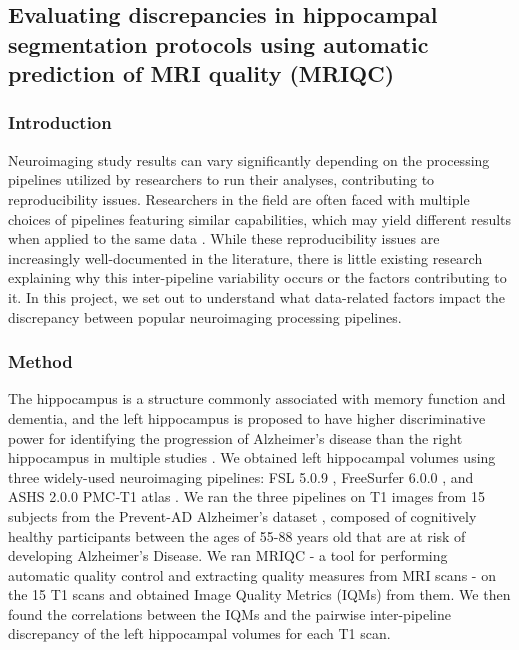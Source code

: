 \documentclass[../main.tex]{subfiles}
\begin{document}
\subsection{Evaluating discrepancies in hippocampal segmentation protocols using automatic prediction of MRI quality (MRIQC)}


\subsubsection{Introduction}

Neuroimaging study results can vary significantly depending on the processing pipelines utilized by researchers to run their analyses, contributing to reproducibility issues. Researchers in the field are often faced with multiple choices of pipelines featuring similar capabilities, which may yield different results when applied to the same data \citep{carp2012plurality, kennedy2019everything}. While these reproducibility issues are increasingly well-documented in the literature, there is little existing research explaining why this inter-pipeline variability occurs or the factors contributing to it. In this project, we set out to understand what data-related factors impact the discrepancy between popular neuroimaging processing pipelines.

\subsubsection{Method}

The hippocampus is a structure commonly associated with memory function and dementia, and the left hippocampus is proposed to have higher discriminative power for identifying the progression of Alzheimer’s disease than the right hippocampus in multiple studies \citep{schuff2009mri}. We obtained left hippocampal volumes using three widely-used neuroimaging pipelines: FSL 5.0.9 \citep{patenaude2011bayesian}, FreeSurfer 6.0.0 \citep{fischl2012freesurfer}, and ASHS 2.0.0 PMC‐T1 atlas \citep{xie2019automated}.
We ran the three pipelines on T1 images from 15 subjects from the Prevent-AD Alzheimer’s dataset \citep{tremblay2021open}, composed of cognitively healthy participants between the ages of 55-88 years old that are at risk of developing Alzheimer's Disease. 
We ran MRIQC \citep{esteban2017mriqc} - a tool for performing automatic quality control and extracting quality measures from MRI scans - on the 15 T1 scans and obtained Image Quality Metrics (IQMs) from them. We then found the correlations between the IQMs and the pairwise inter-pipeline discrepancy of the left hippocampal volumes for each T1 scan.
\end{document}
